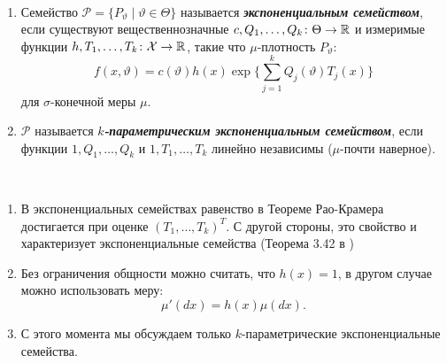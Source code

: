\begin{defn} \
	\begin{enumerate}
		\item Семейство $\mathcal{P}= \{ P_\vartheta \mid \vartheta \in \Theta \}$ называется \textbf{\textit{экспоненциальным семейством}}, если существуют вещественнозначные $c, Q_1, \dots, Q_k \colon \Theta \rightarrow \mathbb{R}$ и измеримые функции $h, T_1, \dots, T_k \colon \mathcal{X} \rightarrow \mathbb{R}$, такие что $\mu$-плотность $P_\vartheta$:
		\[ f(x, \vartheta)=c(\vartheta)h(x)\exp \Big\{ \sum_{j=1}^{k}Q_j(\vartheta)T_j(x) \Big\} \]
		для $\sigma$-конечной меры $\mu$.
		\item $\mathcal{P}$ называется \textbf{\textit{$k$-параметрическим экспоненциальным семейством}}, если функции $1,Q_1, \dots, Q_k$ и $1,T_1, \dots, T_k$ линейно независимы ($\mu$-почти наверное).
	\end{enumerate}
\end{defn}

\begin{rmrk}\
	\begin{enumerate}
		\item В экспоненциальных семействах равенство в Теореме Рао-Крамера достигается при оценке $(T_1,\dots,T_k)^T$. С другой стороны, это свойство и характеризует экспоненциальные семейства (Теорема 3.42 в \cite{BickelDoksum})
		\item Без ограничения общности можно считать, что $h(x) = 1$, в другом случае можно использовать меру:
		\[ \mu'(dx)=h(x)\mu(dx). \]
		\item С этого момента мы обсуждаем только $k$-параметрические экспоненциальные семейства.
	\end{enumerate}
\end{rmrk}

